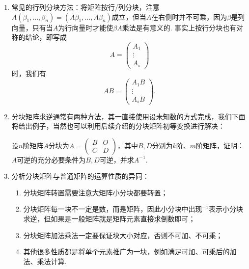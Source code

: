 \begin{enumerate}
    \item 常见的行列分块方法：将矩阵按行/列分块，注意$A(\beta_1,\ldots,\beta_n)=(A\beta_1,\ldots,A\beta_n)$成立，但当$A$在右侧时并不可乘，因为$\beta$是列向量，只有当$A$为行向量时才能使$\beta A$乘法是有意义的. 事实上按行分块也有对称的结论，即写成
          \[A=\begin{pmatrix}
                  A_1 \\ \vdots \\ A_s
              \end{pmatrix}\]
          时，我们有
          \[AB=\begin{pmatrix}
                  A_1B \\ \vdots \\ A_sB
              \end{pmatrix}.\]

    \item 分块矩阵求逆通常有两种方法，其一直接使用设未知数的方式完成，我们下面将给出例子，当然也可以利用后续介绍的分块矩阵初等变换进行解决：
          \begin{example}
              设$n$阶矩阵$A$分块为$A=\begin{pmatrix}
                      B & O \\ C & D
                  \end{pmatrix}$，其中$B,D$分别为$k$阶、$m$阶矩阵，证明：$A$可逆的充分必要条件为$B,D$可逆，并求$A^{-1}$.
          \end{example}

          \begin{solution}

          \end{solution}

    \item 分析分块矩阵与普通矩阵的运算性质的异同：
          \begin{enumerate}
              \item 分块矩阵转置需要注意大矩阵小分块都要转置；

              \item 分块矩阵每一块不一定是数，而是矩阵，因此小分块中出现$^{-1}$表示小分块求逆，但如果是一般矩阵就是矩阵元素直接求倒数即可；

              \item 分块矩阵加法乘法一定要保证块大小对应，否则不可加、不可乘；

              \item 其他很多性质都是将单个元素推广为一块，例如满足可加、可乘后的加法、乘法计算.
          \end{enumerate}
\end{enumerate}

